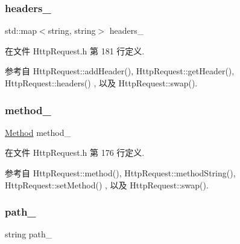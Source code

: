 \subsubsection{\texorpdfstring{headers\+\_\+}{headers\_}}
{\footnotesize\ttfamily std\+::map$<$string, string$>$ headers\+\_\+\hspace{0.3cm}{\ttfamily [private]}}



在文件 Http\+Request.\+h 第 181 行定义.



参考自 Http\+Request\+::add\+Header(), Http\+Request\+::get\+Header(), Http\+Request\+::headers() , 以及 Http\+Request\+::swap().

\mbox{\label{classmuduo_1_1net_1_1HttpRequest_a976da067e26411726fa98bb844e15a12}} 
\subsubsection{\texorpdfstring{method\+\_\+}{method\_}}
{\footnotesize\ttfamily \hyperlink{classmuduo_1_1net_1_1HttpRequest_a2a3c0067e44c5ef3210a256d06c16b0f}{Method} method\+\_\+\hspace{0.3cm}{\ttfamily [private]}}



在文件 Http\+Request.\+h 第 176 行定义.



参考自 Http\+Request\+::method(), Http\+Request\+::method\+String(), Http\+Request\+::set\+Method() , 以及 Http\+Request\+::swap().

\mbox{\label{classmuduo_1_1net_1_1HttpRequest_ab81b8f6431abce193e0fba6d67758aa9}} 
\subsubsection{\texorpdfstring{path\+\_\+}{path\_}}
{\footnotesize\ttfamily string path\+\_\+\hspace{0.3cm}{\ttfamily [private]}}




